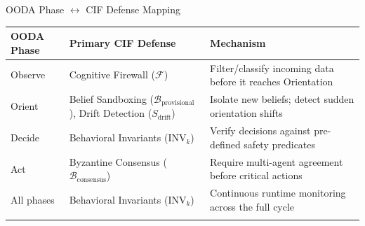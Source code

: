 \documentclass[
  ignorenonframetext,
]{beamer}
\newcounter{none} %
\begin{document}
\begin{frame}[allowframebreaks]{OODA Phase \(\leftrightarrow\) CIF
Defense Mapping}
\protect{}\label{ooda-phase-leftrightarrow-cif-defense-mapping}
{\def\LTcaptype{none} %
\begin{longtable}[]{@{}
  >{\raggedright\arraybackslash}p{}
  >{\raggedright\arraybackslash}p{}
  >{\raggedright\arraybackslash}p{}@{}}
\toprule\noalign{}
\begin{minipage}[b]{\linewidth}\raggedright
OODA Phase
\end{minipage} & \begin{minipage}[b]{\linewidth}\raggedright
Primary CIF Defense
\end{minipage} & \begin{minipage}[b]{\linewidth}\raggedright
Mechanism
\end{minipage} \\
\midrule\noalign{}
\endhead
Observe & Cognitive Firewall (\(\mathcal{F}\)) & Filter/classify
incoming data before it reaches Orientation \\
Orient & Belief Sandboxing (\(\mathcal{B}_{\text{provisional}}\)), Drift
Detection (\(S_{\text{drift}}\)) & Isolate new beliefs; detect sudden
orientation shifts \\
Decide & Behavioral Invariants (\(\text{INV}_k\)) & Verify decisions
against pre-defined safety predicates \\
Act & Byzantine Consensus (\(\mathcal{B}_{\text{consensus}}\)) & Require
multi-agent agreement before critical actions \\
All phases & Behavioral Invariants (\(\text{INV}_k\)) & Continuous
runtime monitoring across the full cycle \\
\bottomrule\noalign{}
\end{longtable}
}
\end{frame}
\end{document}
